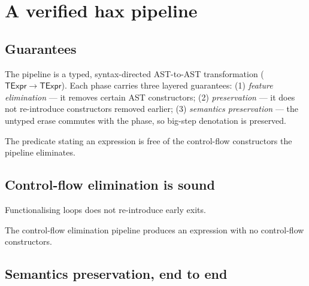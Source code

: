 
\chapter{A verified hax pipeline}

\section{Guarantees}

The pipeline is a typed, syntax-directed AST-to-AST transformation
($\mathsf{TExpr}\to\mathsf{TExpr}$). Each phase carries three layered guarantees:
(1) \emph{feature elimination} --- it removes certain AST constructors;
(2) \emph{preservation} --- it does not re-introduce constructors removed
earlier; (3) \emph{semantics preservation} --- the untyped erase commutes with
the phase, so big-step denotation is preserved.

\begin{definition}
  \label{def:nocf}
  \leanok
  The predicate stating an expression is free of the control-flow constructors
  the pipeline eliminates.
\end{definition}

\section{Control-flow elimination is sound}

\begin{theorem}
  \label{thm:funloops-preserves}
  \leanok
  Functionalising loops does not re-introduce early exits.
\end{theorem}

\begin{theorem}
  \label{thm:pipeline-cf}
  \leanok
  The control-flow elimination pipeline produces an expression with no
  control-flow constructors.
\end{theorem}

\section{Semantics preservation, end to end}

